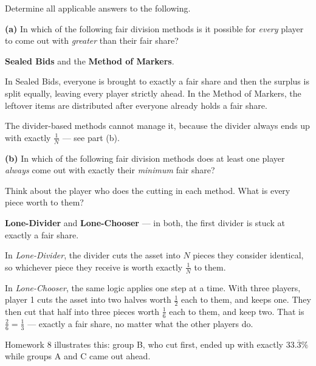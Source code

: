 \documentclass[12pt]{ximera}
\begin{document}
\begin{problem}
Determine all applicable answers to the following.

\begin{prompt}
\textbf{(a)} In which of the following fair division methods is it possible for
\emph{every} player to come out with \emph{greater} than their fair share?

\begin{selectAll}
\end{selectAll}

\begin{feedback}
\textbf{Sealed Bids} and the \textbf{Method of Markers}.

In Sealed Bids, everyone is brought to exactly a fair share and then the surplus is
split equally, leaving every player strictly ahead. In the Method of Markers, the
leftover items are distributed after everyone already holds a fair share.

The divider-based methods cannot manage it, because the divider always ends up with
exactly $\frac1N$ --- see part (b).
\end{feedback}
\end{prompt}

\begin{prompt}
\textbf{(b)} In which of the following fair division methods does at least one player
\emph{always} come out with exactly their \emph{minimum} fair share?

\begin{selectAll}
\end{selectAll}

\begin{hint}
Think about the player who does the cutting in each method. What is every piece worth to
them?
\end{hint}

\begin{feedback}
\textbf{Lone-Divider} and \textbf{Lone-Chooser} --- in both, the first divider is stuck
at exactly a fair share.

In \emph{Lone-Divider}, the divider cuts the asset into $N$ pieces they consider
identical, so whichever piece they receive is worth exactly $\frac1N$ to them.

In \emph{Lone-Chooser}, the same logic applies one step at a time. With three players,
player 1 cuts the asset into two halves worth $\frac12$ each to them, and keeps one.
They then cut that half into three pieces worth $\frac16$ each to them, and keep two.
That is $\frac26 = \frac13$ --- exactly a fair share, no matter what the other players
do.

Homework 8 illustrates this: group B, who cut first, ended up with exactly
$33.\overline{3}\%$ while groups A and C came out ahead.
\end{feedback}
\end{prompt}
\end{problem}
\end{document}
